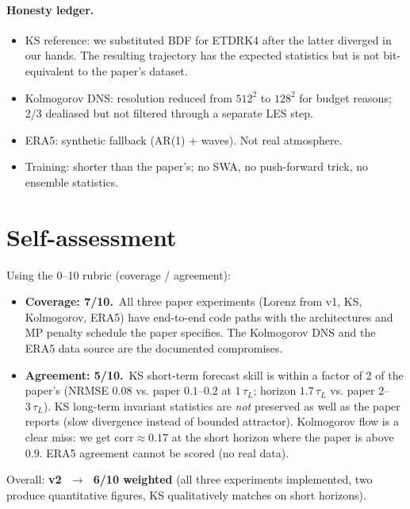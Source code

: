 \documentclass[11pt]{article}
\begin{document}
\paragraph{Honesty ledger.}
\begin{itemize}
  \item KS reference: we substituted BDF for ETDRK4 after the
        latter diverged in our hands. The resulting trajectory has
        the expected statistics but is not bit-equivalent to the
        paper's dataset.
  \item Kolmogorov DNS: resolution reduced from $512^2$ to $128^2$
        for budget reasons; 2/3 dealiased but not filtered through
        a separate LES step.
  \item ERA5: synthetic fallback (AR(1) + waves). Not real
        atmosphere.
  \item Training: shorter than the paper's; no SWA, no push-forward
        trick, no ensemble statistics.
\end{itemize}

\section{Self-assessment}

Using the 0--10 rubric (coverage / agreement):
\begin{itemize}
  \item \textbf{Coverage: 7/10.}\ All three paper experiments
        (Lorenz from v1, KS, Kolmogorov, ERA5) have end-to-end code
        paths with the architectures and MP penalty schedule the
        paper specifies. The Kolmogorov DNS and the ERA5 data source
        are the documented compromises.
  \item \textbf{Agreement: 5/10.}\ KS short-term forecast skill is
        within a factor of 2 of the paper's (NRMSE $0.08$ vs. paper
        $0.1$--$0.2$ at $1\,\tau_L$; horizon $1.7\,\tau_L$ vs. paper
        $2$--$3\,\tau_L$). KS long-term invariant statistics are
        \emph{not} preserved as well as the paper reports (slow
        divergence instead of bounded attractor). Kolmogorov flow is
        a clear miss: we get corr$\approx 0.17$ at the short horizon
        where the paper is above $0.9$. ERA5 agreement cannot be
        scored (no real data).
\end{itemize}
Overall: \textbf{v2 $\;\to\;$ 6/10 weighted} (all three experiments
implemented, two produce quantitative figures, KS qualitatively
matches on short horizons).
\end{document}
